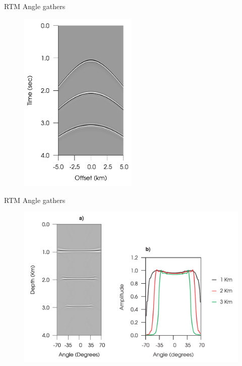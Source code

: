 \documentclass[xcolor=dvipsnames,notes]{beamer}
\begin{document}
\begin{frame}{RTM Angle gathers}
\begin{figure}
\includegraphics[width=0.5\textwidth]{Fig/fig1.pdf}
\end{figure}
\end{frame}
\begin{frame}{RTM Angle gathers}
\begin{figure}
\includegraphics[width=\textwidth]{Fig/fig2.pdf}
\end{figure}
\end{frame}
\end{document}

